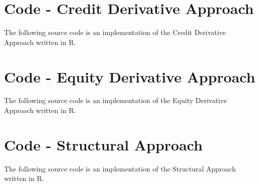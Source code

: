 \chapter{Code - Credit Derivative Approach}

The following source code is an implementation of the Credit Derivative Approach \citep{de2011pricing} written in R.
 



\chapter{Code - Equity Derivative Approach}

The following source code is an implementation of the Equity Derivative Approach \citep{de2011pricing} written in R.
 


\chapter{Code - Structural Approach}

The following source code is an implementation of the Structural Approach \citep{pennacchi2010structural} written in R.
 




